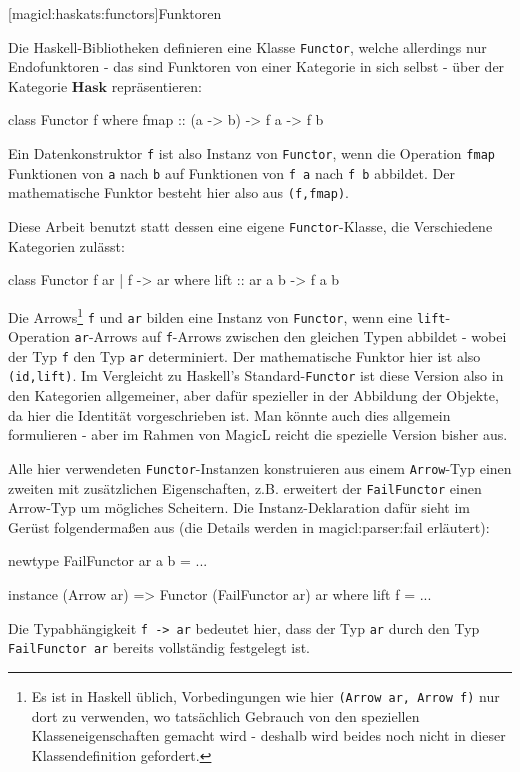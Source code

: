 \documentclass[a4paper, bibgerm]{article}
\newcommand\icode[1]{\lstinline?#1?}
\newcommand\lsubsubsection{}
\newcommand\sref{}
\begin{document}
\lsubsubsection[magicl:haskats:functors]{Funktoren}

Die Haskell-Bibliotheken definieren eine Klasse \icode{Functor}, welche
allerdings nur Endofunktoren - das sind Funktoren von einer Kategorie in
sich selbst - über der Kategorie $\mathbf{Hask}$ repräsentieren:
\begin{code}
class Functor f where
  fmap :: (a -> b) -> f a -> f b 
\end{code}
Ein Datenkonstruktor \icode{f} ist also Instanz von \icode{Functor},
wenn die Operation \icode{fmap} Funktionen von \icode{a} nach \icode{b}
auf Funktionen von \icode{f a} nach \icode{f b} abbildet. Der
mathematische Funktor besteht hier also aus \icode{(f,fmap)}.

Diese Arbeit benutzt statt dessen eine eigene \icode{Functor}-Klasse,
die Verschiedene Kategorien zulässt:
\begin{code}
class Functor f ar | f -> ar where
  lift :: ar a b -> f a b
\end{code}
Die Arrows\footnote{Es ist in Haskell üblich, Vorbedingungen wie hier
  \icode{(Arrow ar, Arrow f)} nur dort zu verwenden, wo tatsächlich
  Gebrauch von den speziellen Klasseneigenschaften gemacht wird -
  deshalb wird beides noch nicht in dieser Klassendefinition gefordert.}
\icode{f} und \icode{ar} bilden eine Instanz von \icode{Functor}, wenn
eine \icode{lift}-Operation \icode{ar}-Arrows auf \icode{f}-Arrows
zwischen den gleichen Typen abbildet - wobei der Typ \icode{f} den Typ
\icode{ar} determiniert. Der mathematische Funktor hier ist also
\icode{(id,lift)}. Im Vergleicht zu Haskell's Standard-\icode{Functor}
ist diese Version also in den Kategorien allgemeiner, aber dafür
spezieller in der Abbildung der Objekte, da hier die Identität
vorgeschrieben ist. Man könnte auch dies allgemein formulieren - aber im
Rahmen von MagicL reicht die spezielle Version bisher aus. 

Alle hier verwendeten \icode{Functor}-Instanzen konstruieren aus einem
\icode{Arrow}-Typ einen zweiten mit zusätzlichen Eigenschaften,
z.B. erweitert der \icode{FailFunctor} einen Arrow-Typ um mögliches
Scheitern. Die Instanz-Deklaration dafür sieht im Gerüst folgendermaßen
aus (die Details werden in \sref{magicl:parser:fail} erläutert):
\begin{code}
newtype FailFunctor ar a b = ...

instance (Arrow ar) => Functor (FailFunctor ar) ar where
  lift f = ...
\end{code}
Die Typabhängigkeit \icode{f -> ar} bedeutet hier, dass der Typ
\icode{ar} durch den Typ \icode{FailFunctor ar} bereits vollständig
festgelegt ist.
\end{document}
